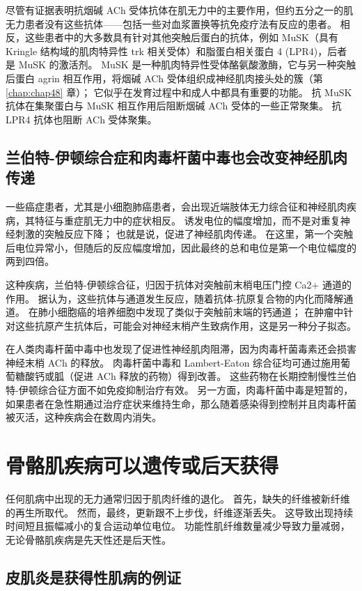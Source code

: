 尽管有证据表明抗烟碱 ACh 受体抗体在肌无力中的主要作用，但约五分之一的肌无力患者没有这些抗体——包括一些对血浆置换等抗免疫疗法有反应的患者。 相反，这些患者中的大多数具有针对其他突触后蛋白的抗体，例如 MuSK（具有 Kringle 结构域的肌肉特异性 trk 相关受体）和脂蛋白相关蛋白 4 (LPR4)，后者是 MuSK 的激活剂。 MuSK 是一种肌肉特异性受体酪氨酸激酶，它与另一种突触后蛋白 agrin 相互作用，将烟碱 ACh 受体组织成神经肌肉接头处的簇（第 \ref{chap:chap48} 章）； 它似乎在发育过程中和成人中都具有重要的功能。 抗 MuSK 抗体在集聚蛋白与 MuSK 相互作用后阻断烟碱 ACh 受体的一些正常聚集。 抗 LPR4 抗体也阻断 ACh 受体聚集。

\subsection{兰伯特-伊顿综合症和肉毒杆菌中毒也会改变神经肌肉传递}

一些癌症患者，尤其是小细胞肺癌患者，会出现近端肢体无力综合征和神经肌肉疾病，其特征与重症肌无力中的症状相反。 诱发电位的幅度增加，而不是对重复神经刺激的突触反应下降； 也就是说，促进了神经肌肉传递。 在这里，第一个突触后电位异常小，但随后的反应幅度增加，因此最终的总和电位是第一个电位幅度的两到四倍。

这种疾病，兰伯特-伊顿综合征，归因于抗体对突触前末梢电压门控 Ca2+ 通道的作用。 据认为，这些抗体与通道发生反应，随着抗体-抗原复合物的内化而降解通道。 在肺小细胞癌的培养细胞中发现了类似于突触前末端的钙通道； 在肿瘤中针对这些抗原产生抗体后，可能会对神经末梢产生致病作用，这是另一种分子拟态。

在人类肉毒杆菌中毒中也发现了促进性神经肌肉阻滞，因为肉毒杆菌毒素还会损害神经末梢 ACh 的释放。 肉毒杆菌中毒和 Lambert-Eaton 综合征均可通过施用葡萄糖酸钙或胍（促进 ACh 释放的药物）得到改善。 这些药物在长期控制慢性兰伯特-伊顿综合征方面不如免疫抑制治疗有效。 另一方面，肉毒杆菌中毒是短暂的，如果患者在急性期通过治疗症状来维持生命，那么随着感染得到控制并且肉毒杆菌被灭活，这种疾病会在数周内消失。

\section{骨骼肌疾病可以遗传或后天获得}

任何肌病中出现的无力通常归因于肌肉纤维的退化。 首先，缺失的纤维被新纤维的再生所取代。 然而，最终，更新跟不上步伐，纤维逐渐丢失。 这导致出现持续时间短且振幅减小的复合运动单位电位。 功能性肌纤维数量减少导致力量减弱，无论骨骼肌疾病是先天性还是后天性。


\subsection{皮肌炎是获得性肌病的例证}

